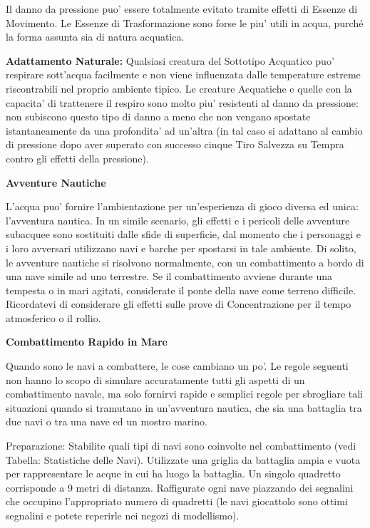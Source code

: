 \documentclass[a4paper,11pt,twoside,openany]{book}
\begin{document}
{Il danno da pressione puo' essere totalmente evitato tramite effetti di Essenze di Movimento. Le Essenze di Trasformazione sono forse le piu' utili in acqua, purché la forma assunta sia di natura acquatica.

\textbf{Adattamento Naturale:} Qualsiasi creatura del Sottotipo Acquatico puo' respirare sott'acqua facilmente e non viene influenzata dalle temperature estreme riscontrabili nel proprio ambiente tipico. Le creature Acquatiche e quelle con la capacita' di trattenere il respiro sono molto piu' resistenti al danno da pressione: non subiscono questo tipo di danno a meno che non vengano spostate istantaneamente da una profondita' ad un'altra (in tal caso si adattano al cambio di pressione dopo aver superato con successo cinque Tiro Salvezza su Tempra contro gli effetti della pressione).

\textbf{Avventure Nautiche}

L'acqua puo' fornire l'ambientazione per un'esperienza di gioco diversa ed unica: l'avventura nautica. In un simile scenario, gli effetti e i pericoli delle avventure subacquee sono sostituiti dalle sfide di superficie, dal momento che i personaggi e i loro avversari utilizzano navi e barche per spostarsi in tale ambiente. Di solito, le avventure nautiche si risolvono normalmente, con un combattimento a bordo di una nave simile ad uno terrestre. Se il combattimento avviene durante una tempesta o in mari agitati, considerate il ponte della nave come terreno difficile. Ricordatevi di considerare gli effetti sulle prove di Concentrazione per il tempo atmosferico o il rollio.

\textbf{Combattimento Rapido in Mare}

Quando sono le navi a combattere, le cose cambiano un po'. Le regole seguenti non hanno lo scopo di simulare accuratamente tutti gli aspetti di un combattimento navale, ma solo fornirvi rapide e semplici regole per sbrogliare tali situazioni quando si tramutano in un'avventura nautica, che sia una battaglia tra due navi o tra una nave ed un mostro marino.

{Preparazione:} Stabilite quali tipi di navi sono coinvolte nel combattimento (vedi Tabella: Statistiche delle Navi). Utilizzate una griglia da battaglia ampia e vuota per rappresentare le acque in cui ha luogo la battaglia. Un singolo quadretto corrisponde a 9 metri di distanza. Raffigurate ogni nave piazzando dei segnalini che occupino l'appropriato numero di quadretti (le navi giocattolo sono ottimi segnalini e potete reperirle nei negozi di modellismo).{}

}
\end{document}
